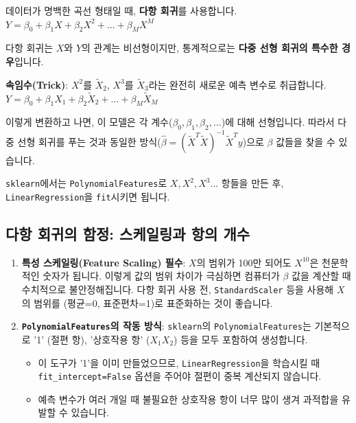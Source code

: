 \documentclass[11pt,a4paper]{book}
\theoremstyle{definition}
\begin{document}
데이터가 명백한 곡선 형태일 때, \textbf{다항 회귀}를 사용합니다.
$Y = \beta_0 + \beta_1 X + \beta_2 X^2 + \dots + \beta_M X^M$

\begin{summarybox}[title=다항 회귀의 "속임수": 왜 이것도 선형 회귀인가?]
다항 회귀는 $X$와 $Y$의 관계는 비선형이지만, 통계적으로는 \textbf{다중 선형 회귀의 특수한 경우}입니다.

\textbf{속임수(Trick)}: $X^2$를 $\tilde{X}_2$, $X^3$를 $\tilde{X}_3$라는 완전히 새로운 예측 변수로 취급합니다.
$Y = \beta_0 + \beta_1 X_1 + \beta_2 \tilde{X}_2 + \dots + \beta_M \tilde{X}_M$

이렇게 변환하고 나면, 이 모델은 각 계수($\beta_0, \beta_1, \beta_2, \dots$)에 대해 선형입니다.
따라서 다중 선형 회귀를 푸는 것과 동일한 방식($\hat{\beta} = (\tilde{X}^T \tilde{X})^{-1} \tilde{X}^T y$)으로 $\beta$ 값들을 찾을 수 있습니다.

\texttt{sklearn}에서는 \texttt{PolynomialFeatures}로 $X, X^2, X^3...$ 항들을 만든 후, \texttt{LinearRegression}을 \texttt{fit}시키면 됩니다.
\end{summarybox}

\subsection{다항 회귀의 함정: 스케일링과 항의 개수}

\begin{warningbox}[title=다항 회귀 사용 시 주의사항]
\begin{enumerate}
    \item \textbf{특성 스케일링(Feature Scaling) 필수}:
    $X$의 범위가 100만 되어도 $X^{10}$은 천문학적인 숫자가 됩니다. 이렇게 값의 범위 차이가 극심하면 컴퓨터가 $\beta$ 값을 계산할 때 수치적으로 불안정해집니다.
    다항 회귀 사용 전, \texttt{StandardScaler} 등을 사용해 $X$의 범위를 (평균=0, 표준편차=1)로 표준화하는 것이 좋습니다.

    \item \textbf{\texttt{PolynomialFeatures}의 작동 방식}:
    \texttt{sklearn}의 \texttt{PolynomialFeatures}는 기본적으로 '1' (절편 항), '상호작용 항' ($X_1 X_2$) 등을 모두 포함하여 생성합니다.
    \begin{itemize}
        \item 이 도구가 '1'을 이미 만들었으므로, \texttt{LinearRegression}을 학습시킬 때 \texttt{fit\_intercept=False} 옵션을 주어야 절편이 중복 계산되지 않습니다.
        \item 예측 변수가 여러 개일 때 불필요한 상호작용 항이 너무 많이 생겨 과적합을 유발할 수 있습니다.
    \end{itemize}
\end{enumerate}
\end{warningbox}
\end{document}
